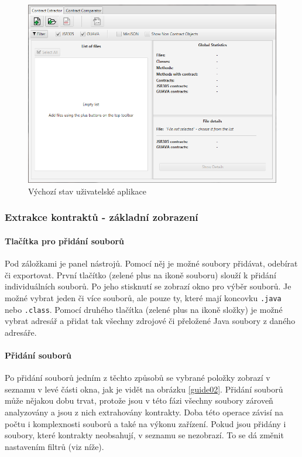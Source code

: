 			\begin{figure}[!htb]
					\centering
					\includegraphics[width=1\textwidth]{img/guide01.png}
					\caption[guide01]{Výchozí stav uživatelské aplikace}
					\label{guide01}
				\endminipage\hfill
			\end{figure}
			
			\subsubsection{Extrakce kontraktů - základní zobrazení}
			
				\paragraph{Tlačítka pro přidání souborů}				
					Pod záložkami je panel nástrojů. Pomocí něj je možné soubory přidávat, odebírat či exportovat. První tlačítko (zelené plus na ikoně souboru) slouží k přidání individuálních souborů. Po jeho stisknutí se zobrazí okno pro výběr souborů. Je možné vybrat jeden či více souborů, ale pouze ty, které mají koncovku \texttt{.java} nebo \texttt{.class}. Pomocí druhého tlačítka (zelené plus na ikoně složky) je možné vybrat adresář a přidat tak všechny zdrojové či přeložené Java soubory z daného adresáře.\\
			
				\paragraph{Přidání souborů}
					Po přidání souborů jedním z těchto způsobů se vybrané položky zobrazí v seznamu v levé části okna, jak je vidět na obrázku \ref{guide02}. Přidání souborů může nějakou dobu trvat, protože jsou v této fázi všechny soubory zároveň analyzovány a jsou z nich extrahovány kontrakty. Doba této operace závisí na počtu i komplexnosti souborů a také na výkonu zařízení. Pokud jsou přidány i soubory, které kontrakty neobsahují, v seznamu se nezobrazí. To se dá změnit nastavením filtrů (viz níže).\\
			
